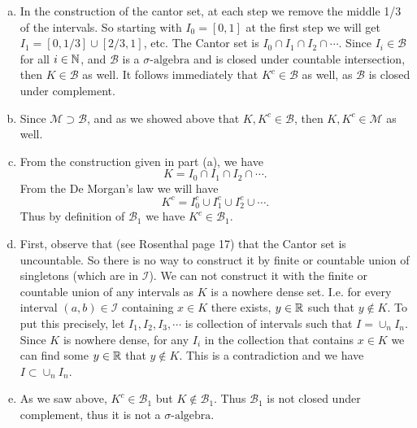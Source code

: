 \begin{solution}
	\begin{enumerate}[(a)]
		\item In the construction of the cantor set, at each step we remove the middle 1/3 of the intervals. So starting with $ I_0 = [0,1] $ at the first step we will get $ I_1 =  [0,1/3]\cup[2/3,1] $, etc. The Cantor set is $ I_0 \cap I_1 \cap I_2 \cap \cdots $. Since $ I_i \in \mathcal{B} $ for all $ i \in \mathbb{N} $, and $ \mathcal{B} $ is a $ \sigma\text{-algebra} $ and is closed under countable intersection, then $ K \in \mathcal{B} $ as well. It follows immediately that $ K^c \in \mathcal{B} $ as well, as $ \mathcal{B} $ is closed under complement.
		\item Since $ \mathcal{M} \supset \mathcal{B}$, and as we showed above that $ K,K^c \in \mathcal{B} $, then $ K,K^c \in \mathcal{M} $ as well.
		\item From the construction given in part (a), we have
		\[ K = I_0 \cap I_1 \cap I_2 \cap \cdots. \]
		From the De Morgan's law we will have
		\[ K^c = I_0^c \cup I_1^c \cup I_2^c \cup \cdots. \]
		Thus by definition of $ \mathcal{B}_1 $ we have $ K^c \in \mathcal{B}_1 $.
		\item First, observe that (see Rosenthal page 17) that the Cantor set is uncountable. So there is no way to construct it by finite or countable union of singletons (which are in $ \mathcal{I} $). We can not construct it with the finite or countable union of any intervals as $ K $ is a nowhere dense set. I.e. for every interval $ (a,b) \in \mathcal{I} $ containing $ x \in K $ there exists, $ y\in \mathbb{R} $ such that $ y \notin K $. To put this precisely, let $ I_1,I_2,I_3,\cdots $ is collection of intervals such that $ I = \cup_n I_n $. Since $ K $ is nowhere dense, for any $ I_i $ in the collection that contains $ x \in K $ we can find some $ y \in \mathbb{R} $ that $ y \notin K $. This is a contradiction and we have $ I \subset \cup_n I_n $.
		\item As we saw above, $ K^c \in \mathcal{B}_1 $ but $ K \notin \mathcal{B}_1 $. Thus $ \mathcal{B}_1 $ is not closed under complement, thus it is not a $ \sigma\text{-algebra} $.
	\end{enumerate}
\end{solution}

